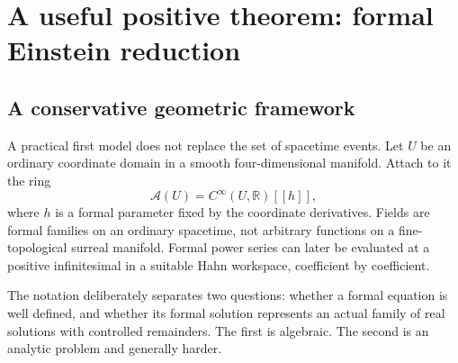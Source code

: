 \documentclass[11pt,a4paper]{article}
\numberwithin{equation}{section}
\theoremstyle{definition}
\theoremstyle{remark}
\newcommand{\R}{\mathbb R}
\begin{document}
\section{A useful positive theorem: formal Einstein reduction}\label{sec:einstein}

\subsection{A conservative geometric framework}
A practical first model does not replace the set of spacetime events. Let $U$
be an ordinary coordinate domain in a smooth four-dimensional manifold. Attach
to it the ring
\[
\mathcal A(U)=C^\infty(U,\R)[[h]],
\]
where $h$ is a formal parameter fixed by the coordinate derivatives. Fields are
formal families on an ordinary spacetime, not arbitrary functions on a
fine-topological surreal manifold. Formal power series can later be evaluated
at a positive infinitesimal in a suitable Hahn workspace, coefficient by
coefficient.

The notation deliberately separates two questions: whether a formal equation
is well defined, and whether its formal solution represents an actual family
of real solutions with controlled remainders. The first is algebraic. The
second is an analytic problem and generally harder.
\end{document}

